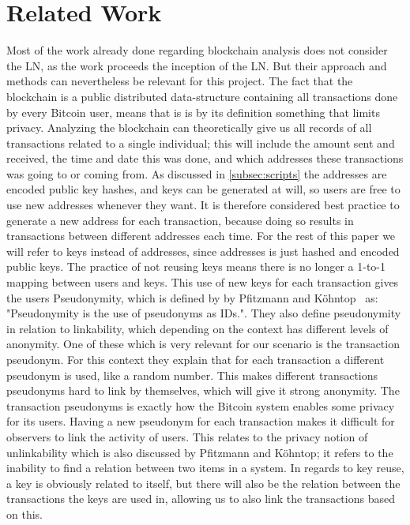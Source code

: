 
\section{Related Work}
\label{sec:related}

Most of the work already done regarding blockchain analysis does not consider the LN, as the work proceeds the inception of the LN. But their approach and methods can nevertheless be relevant for this project.
The fact that the blockchain is a public distributed data-structure containing all transactions done by every Bitcoin user, means that is is by its definition something that limits privacy. Analyzing the blockchain can theoretically give us all records of all transactions related to a single individual; this will include the amount sent and received, the time and date this was done, and which addresses these transactions was going to or coming from. As discussed in \cref{subsec:scripts} the addresses are encoded public key hashes, and keys can be generated at will, so users are free to use new addresses whenever they want. It is therefore considered best practice to generate a new address for each transaction, because doing so results in transactions between different addresses each time. For the rest of this paper we will refer to keys instead of addresses, since addresses is just hashed and encoded public keys. 
The practice of not reusing keys means there is no longer a 1-to-1 mapping between users and keys.
This use of new keys for each transaction gives the users Pseudonymity, which is defined by by Pfitzmann and Köhntop~\cite{pfitzmann2001anonymity} as: "Pseudonymity is the use of pseudonyms as IDs.". They also define pseudonymity in relation to linkability, which depending on the context has different levels of anonymity. One of these which is very relevant for our scenario is the transaction pseudonym. For this context they explain that for each transaction a different pseudonym is used, like a random number. This makes different transactions pseudonyms hard to link by themselves, which will give it strong anonymity. The transaction pseudonyms is exactly how the Bitcoin system enables some privacy for its users. Having a new pseudonym for each transaction makes it difficult for observers to link the activity of users. This relates to the privacy notion of unlinkability which is also discussed by Pfitzmann and Köhntop; it refers to the inability to find a relation between two items in a system. 
In regards to key reuse, a key is obviously related to itself, but there will also be the relation between the transactions the keys are used in, allowing us to also link the transactions based on this.
